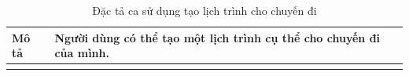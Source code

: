 \begin{longtable}{| p{4cm} | p{\dimexpr\linewidth-4cm-4\tabcolsep} |} %
    \caption{Đặc tả ca sử dụng tạo lịch trình cho chuyến đi} %
    \label{tab:uc_create_itinerary_item_spec} \\ %

    \hline
    \textbf{Mô tả} & Người dùng có thể tạo một lịch trình cụ thể cho chuyến đi của mình. \\
    \hline
    \endfirsthead %



    \hline %
    \endlastfoot


\end{longtable}
